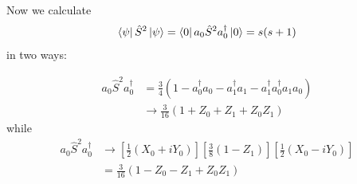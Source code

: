 \documentclass[11pt, oneside]{article}   	%
\begin{document}
Now we calculate
\begin{equation}
\bra{\psi} \hat{S}^2 \ket{\psi} 
= \bra{0} a_0 \hat{S}^2 a^{\dagger}_0 \ket{0}
= s (s + 1)
\end{equation}
in two ways:

\begin{align}
a_0 \hat{S}^2 a^{\dagger}_0 
&= \frac{3}{4} (1 - a^{\dagger}_0 a_0 - a^{\dagger}_1 a_1 - a^{\dagger}_1 a^{\dagger}_0 a_1 a_0) \\
&\to \frac{3}{16} (1 + Z_0 + Z_1 + Z_0 Z_1)
\end{align}
while
\begin{align}
a_0 \hat{S}^2 a^{\dagger}_0 
&\to \left[ \frac{1}{2} (X_0 + i Y_0) \right] \left[ \frac{3}{8} (1 - Z_1) \right] \left[ \frac{1}{2} (X_0 - i Y_0) \right] \\
&= \frac{3}{16} (1 - Z_0 - Z_1 + Z_0 Z_1)
\end{align}
\end{document}
